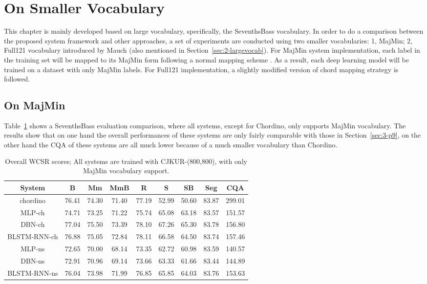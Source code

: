 \section{On Smaller Vocabulary}
This chapter is mainly developed based on large vocabulary, specifically, the SeventhsBass vocabulary. In order to do a comparison between the proposed system framework and other approaches, a set of experiments are conducted using two smaller vocabularies: 1, MajMin; 2, Full121 vocabulary introduced by Mauch \cite{mauch2010automatic} (also mentioned in Section~\ref{sec:2-largevocab}). For MajMin system implementation, each label in the training set will be mapped to its MajMin form following a normal mapping scheme \cite{harte2010towards,pauwels2013evaluating}. As a result, each deep learning model will be trained on a dataset with only MajMin labels. For Full121 implementation, a slightly modified version of chord mapping strategy \cite{mauch2010automatic} is followed.

\subsection{On MajMin}
Table~\ref{tab:3-overallres} shows a SeventhsBass evaluation comparison, where all systems, except for Chordino, only supports MajMin vocabulary. The results show that on one hand the overall performances of these systems are only fairly comparable with those in Section~\ref{sec:3-p9}, on the other hand the CQA of these systems are all much lower because of a much smaller vocabulary than Chordino.
\begin{table}[h]
\footnotesize
\centering
\caption{Overall WCSR scores; All systems are trained with CJKUR-(800,800), with only MajMin vocabulary support.}
\label{tab:3-overallres}
\begin{tabular}{|c|c|c|c|c|c|c|c|c|}\hline
System & B & Mm & MmB & R & S & SB & Seg & CQA \\ \hline
chordino & 76.41 & 74.30 & 71.40 & 77.19 & 52.99 & 50.60 & 83.87 & 299.01\\ \hline
MLP-ch & 74.71 & 73.25 & 71.22 & 75.74 & 65.08 & 63.18 & 83.57 & 151.57\\ \hline
DBN-ch & 77.04 & 75.50 & 73.39 & 78.10 & 67.26 & 65.30 & 83.78 & 156.80\\ \hline
BLSTM-RNN-ch & 76.88 & 75.05 & 72.84 & 78.11 & 66.58 & 64.50 & 83.74 & 157.46\\ \hline
MLP-ns & 72.65 & 70.00 & 68.14 & 73.35 & 62.72 & 60.98 & 83.59 & 140.57\\ \hline
DBN-ns & 72.91 & 70.96 & 69.14 & 73.66 & 63.33 & 61.66 & 83.44 & 144.89\\ \hline
BLSTM-RNN-ns & 76.04 & 73.98 & 71.99 & 76.85 & 65.85 & 64.03 & 83.76 & 153.63\\ \hline
\end{tabular}
\end{table}

